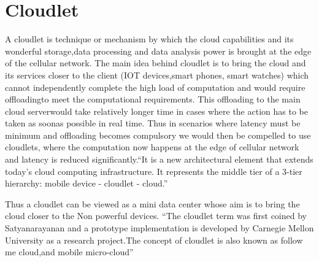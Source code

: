 \section{Cloudlet}


A cloudlet is technique or mechanism by which the cloud capabilities
and its wonderful storage,data processing and data analysis power is
brought at the edge of the cellular network.  The main idea behind
cloudlet is to bring the cloud and its services closer to the
client (IOT devices,smart phones, smart watches) which cannot
independently complete the high load of computation and would require
offloadingto meet the computational requirements. This offloading to
the main cloud serverwould take relatively longer time in cases where
the action has to be taken as soonas possible in real time. Thus in
scenarios where latency must be minimum and offloading becomes
compulsory we would then be compelled to use cloudlets, where the
computation now happens at the edge of cellular network and latency is
reduced significantly.``It is a new architectural element that extends
today’s cloud computing infrastructure.  It represents the middle tier
of a 3-tier hierarchy: mobile device - cloudlet -
cloud.''~\cite{hid-sp18-410-wikiCloudlet}

Thus a cloudlet can be viewed as a mini data center whose aim is to
bring the cloud closer to the Non powerful devices. ``The cloudlet
term was first coined by Satyanarayanan and a prototype implementation
is developed by Carnegie Mellon University as a research project.The
concept of cloudlet is also known as follow me cloud,and mobile
micro-cloud''~\cite{hid-sp18-410-wikiCloudlet}
